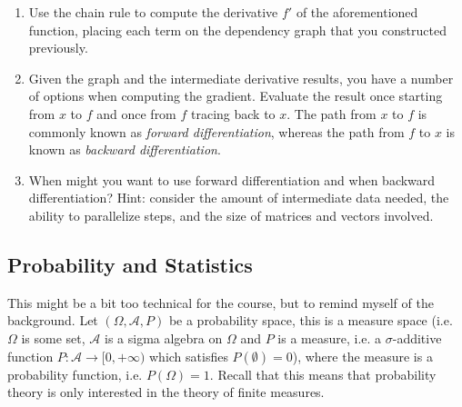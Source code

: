 \documentclass{article}
\begin{document}
\begin{enumerate}
\item Use the chain rule to compute the derivative $f'$ of the aforementioned function, placing each term on the dependency graph that you constructed previously.
\item Given the graph and the intermediate derivative results, you have a number of options when computing the gradient. Evaluate the result once starting from $x$ to $f$ and once from $f$ tracing back to $x$. The path from $x$ to $f$ is commonly known as \textit{forward differentiation}, whereas the path from $f$ to $x$ is known as \textit{backward differentiation}.
\item When might you want to use forward differentiation and when backward differentiation? Hint: consider the amount of intermediate data needed, the ability to parallelize steps, and the size of matrices and vectors involved.
\end{enumerate}

\subsection{Probability and Statistics}
This might be a bit too technical for the course, but to remind myself of the background. Let $(\Omega, \mathcal{A}, P)$ be a probability space, this is a measure space (i.e. $\Omega$ is some set, $\mathcal{A}$ is a sigma algebra on $\Omega$ and $P$ is a measure, i.e. a $\sigma$-additive function $P : \mathcal{A} \rightarrow [0, +\infty)$ which satisfies $P(\emptyset) = 0$), where the measure is a probability function, i.e. $P(\Omega) = 1$. Recall that this means that probability theory is only interested in the theory of finite measures.
\end{document}

